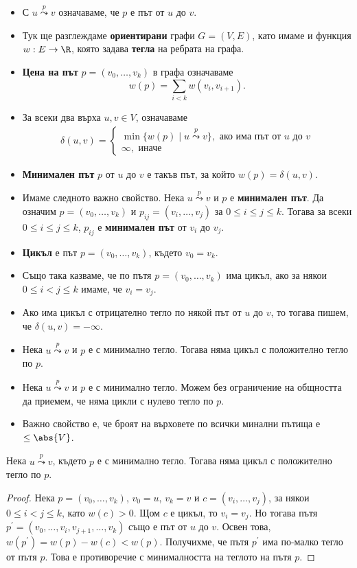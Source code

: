 \begin{itemize}
\item
  С $u \stackrel{p}{\leadsto} v$ означаваме, че $p$ е път от $u$ до $v$.
\item
  Тук ще разглеждаме {\bf ориентирани} графи $G = (V,E)$, като имаме и 
  функция $w: E\to \R$, която задава {\bf тегла} на ребрата на графа.
\item 
  {\bf Цена на път} $p = (v_0,\dots,v_k)$ в графа означаваме 
  \[w(p) = \sum_{i<k} w(v_i,v_{i+1}).\]
\item
  За всеки два върха $u,v \in V$, означаваме
  \begin{align*}
    \delta(u,v) = 
    \begin{cases}
      \min\{w(p)\mid u \stackrel{p}{\leadsto} v\}, \mbox{ ако има път от }u\mbox{ до }v\\
      \infty, \mbox{ иначе }
    \end{cases}
  \end{align*}
\item
  {\bf Минимален път} $p$ от $u$ до $v$ е такъв път, за който $w(p) = \delta(u,v)$.
\item
  Имаме следното важно свойство.
  Нека $u \stackrel{p}{\leadsto} v$ и $p$ е {\bf минимален път}.
  Да означим $p = (v_0,\dots,v_k)$ и $p_{ij} = (v_i,\dots,v_j)$ за $0\leq i \leq j \leq k$.
  Тогава за всеки $0\leq i \leq j \leq k$, 
  $p_{ij}$ е {\bf минимален път} от $v_i$ до $v_j$.
\item
  {\bf Цикъл} е път $p = (v_0,\dots,v_k)$, където $v_0 = v_k$.
\item
  Също така казваме, че по пътя $p = (v_0,\dots,v_k)$ има цикъл, ако
  за някои $0 \leq i < j \leq k$ имаме, че $v_i = v_j$.
\item
  Ако има цикъл с отрицателно тегло по някой път от $u$ до $v$, то 
  тогава пишем, че $\delta(u,v) = -\infty$.
\item
  Нека $u \stackrel{p}{\leadsto} v$ и $p$ е с минимално тегло.
  Тогава няма цикъл с положително тегло по $p$.
\item
  Нека $u \stackrel{p}{\leadsto} v$ и $p$ е с минимално тегло.
  Можем без ограничение на общността да приемем, че няма цикли с нулево тегло
  по $p$.
\item
  Важно свойство е, че броят на върховете по всички минални пътища е $\leq \abs{V}$.
\end{itemize}

\begin{prop}
  Нека $u \stackrel{p}{\leadsto} v$, където $p$ е с минимално тегло.
  Тогава няма цикъл с положително тегло по $p$.
\end{prop}
\begin{proof}
  Нека $p = (v_0,\dots,v_k)$, $v_0 = u$, $v_k = v$ и 
  $c = (v_i,\dots,v_j)$, за някои $0 \leq i < j \leq k$, 
  като $w(c) > 0$. Щом $c$ е цикъл, то $v_i = v_j$.
  Но тогава пътя $p^\prime = (v_0,\dots,v_i,v_{j+1},\dots,v_k)$ също е път от $u$ до $v$.
  Освен това, $w(p^\prime) = w(p) - w(c) < w(p)$.
  Получихме, че пътя $p^\prime$ има по-малко тегло от пътя $p$.
  Това е противоречие с минималността на теглото на пътя $p$.
\end{proof}




